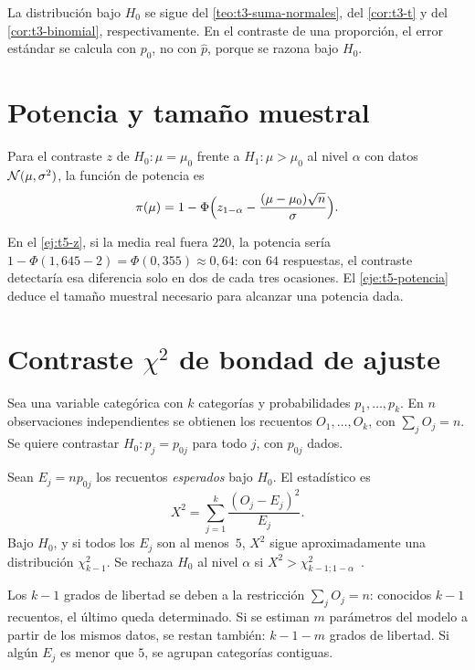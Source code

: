 La distribución bajo $H_0$ se sigue del \cref{teo:t3-suma-normales}, del \cref{cor:t3-t} y del \cref{cor:t3-binomial}, respectivamente. En el contraste de una proporción, el error estándar se calcula con $p_0$, no con $\widehat p$, porque se razona bajo $H_0$.

\addtocounter{definicion}{1}%

\section{Potencia y tamaño muestral}

\begin{proposicion}\label{prop:t5-potencia}
Para el contraste $z$ de $H_0:\mu=\mu_0$ frente a $H_1:\mu>\mu_0$ al nivel $\alpha$ con datos $\mathcal{N}(\mu,\sigma^{2})$, la función de potencia es
\[
\pi(\mu)=1-\Phi\Bigl(z_{1-\alpha}-\frac{(\mu-\mu_0)\sqrt n}{\sigma}\Bigr).
\]
\end{proposicion}

En el \cref{ej:t5-z}, si la media real fuera $220$, la potencia sería $1-\Phi(1{,}645-2)=\Phi(0{,}355)\approx0{,}64$: con $64$ respuestas, el contraste detectaría esa diferencia solo en dos de cada tres ocasiones. El \cref{eje:t5-potencia} deduce el tamaño muestral necesario para alcanzar una potencia dada.

\section{Contraste \texorpdfstring{$\chi^{2}$}{chi cuadrado} de bondad de ajuste}

Sea una variable categórica con $k$ categorías y probabilidades $p_1,\dots,p_k$. En $n$ observaciones independientes se obtienen los recuentos $O_1,\dots,O_k$, con $\sum_jO_j=n$. Se quiere contrastar $H_0:p_j=p_{0j}$ para todo $j$, con $p_{0j}$ dados.

\begin{definicion}\label{def:t5-chi2}
Sean $E_j=np_{0j}$ los recuentos \emph{esperados} bajo $H_0$. El estadístico es
\[
X^{2}=\sum_{j=1}^{k}\frac{(O_j-E_j)^{2}}{E_j}.
\]
Bajo $H_0$, y si todos los $E_j$ son al menos~$5$, $X^{2}$ sigue aproximadamente una distribución $\chi^{2}_{k-1}$. Se rechaza $H_0$ al nivel $\alpha$ si $X^{2}>\chi^{2}_{k-1;1-\alpha}$~\cite[§11.2]{openstax}.
\end{definicion}

Los $k-1$ grados de libertad se deben a la restricción $\sum_jO_j=n$: conocidos $k-1$ recuentos, el último queda determinado. Si se estiman $m$ parámetros del modelo a partir de los mismos datos, se restan también: $k-1-m$ grados de libertad. Si algún $E_j$ es menor que $5$, se agrupan categorías contiguas.

